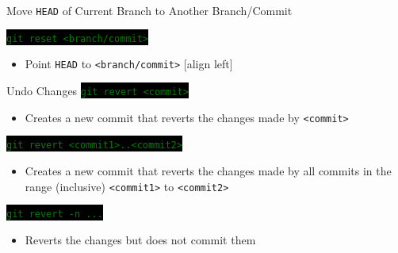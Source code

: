 \documentclass[
14pt,
aspectratio=169,
usenames,
dvipsnames,
x11names]{beamer}
\newcommand{\code}[1]{{\small\setlength{\fboxsep}{2pt}\colorbox{black}{\textcolor{green}{\texttt{#1}}}}}
\begin{document}
\begin{frame}{Move \texttt{HEAD} of Current Branch to Another Branch/Commit}

  \code{git reset <branch/commit>}
  \begin{itemize}
  \item Point \texttt{HEAD} to \texttt{<branch/commit>}
    [align left]
  \end{itemize}
\end{frame}

\begin{frame}{Undo Changes}
  \code{git revert <commit>}
  \begin{itemize}
  \item Creates a new commit that reverts the changes made by
    \texttt{<commit>}
  \end{itemize}

  \vfill
  \pause

  \code{git revert <commit1>..<commit2>}
  \begin{itemize}
  \item Creates a new commit that reverts the changes made by all
    commits in the range (inclusive) \texttt{<commit1>} to
    \texttt{<commit2>}
  \end{itemize}

  \vfill
  \pause

  \code{git revert -n ...}
  \begin{itemize}
  \item Reverts the changes but does not commit them
  \end{itemize}
\end{frame}
\end{document}
